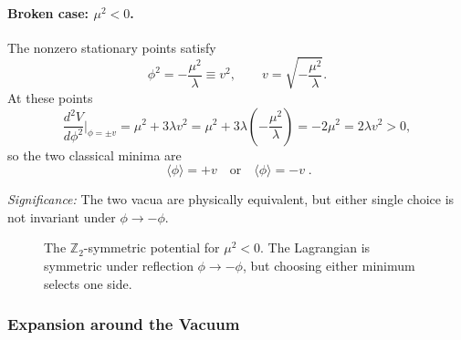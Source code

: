 \paragraph{Broken case: $\mu^2<0$.}
The nonzero stationary points satisfy
\begin{equation}
  \phi^2=-\frac{\mu^2}{\lambda}\equiv v^2,
  \qquad
  v=\sqrt{-\frac{\mu^2}{\lambda}} .
  \label{eq:lec15:z2_v_definition}
\end{equation}
At these points
\begin{equation}
  \frac{d^2V}{d\phi^2}\bigg|_{\phi=\pm v}
  =\mu^2+3\lambda v^2
  =\mu^2+3\lambda\left(-\frac{\mu^2}{\lambda}\right)
  =-2\mu^2
  =2\lambda v^2>0,
  \label{eq:lec15:z2_broken_second_derivative}
\end{equation}
so the two classical minima are
\begin{equation}
  \boxed{\;\langle\phi\rangle=+v\quad\text{or}\quad \langle\phi\rangle=-v\; .}
  \label{eq:lec15:z2_two_vacua}
\end{equation}

\textit{Significance:} The two vacua are physically equivalent, but either single choice is not invariant under $\phi\to-\phi$.

\begin{figure}[ht]
\centering
{}
\caption{The $\mathbb Z_2$-symmetric potential for $\mu^2<0$. The Lagrangian is symmetric under reflection $\phi\to-\phi$, but choosing either minimum selects one side.}
\label{fig:lec15:z2-double-well}
\end{figure}

\subsubsection*{Expansion around the Vacuum}

